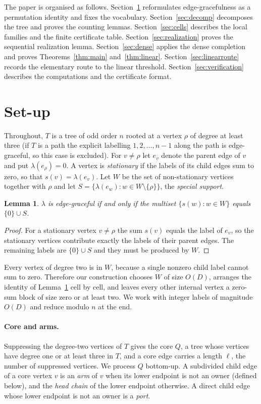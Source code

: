 \documentclass[11pt,a4paper]{article}
\theoremstyle{plain}
\newtheorem{lemma}[theorem]{Lemma}
\theoremstyle{definition}
\theoremstyle{remark}
\begin{document}
The paper is organised as follows.  Section~\ref{sec:setup} reformulates
edge-gracefulness as a permutation identity and fixes the vocabulary.
Section~\ref{sec:decomp} decomposes the tree and proves the counting lemmas.
Section~\ref{sec:cells} describes the local families and the finite
certificate table.  Section~\ref{sec:realization} proves the sequential
realization lemma.  Section~\ref{sec:dense} applies the dense completion and
proves Theorems~\ref{thm:main} and~\ref{thm:linear}.
Section~\ref{sec:linearroute} records the elementary route to the linear
threshold.  Section~\ref{sec:verification} describes the computations and the
certificate format.

\section{Set-up}\label{sec:setup}

Throughout, $T$ is a tree of odd order $n$ rooted at a vertex $\rho$ of degree
at least three (if $T$ is a path the explicit labelling $1,2,\dots,n-1$ along
the path is edge-graceful, so this case is excluded).  For $v\ne\rho$ let
$e_v$ denote the parent edge of $v$ and put $\lambda(e_\rho)=0$.  A vertex is
\emph{stationary} if the labels of its child edges sum to zero, so that
$s(v)=\lambda(e_v)$.  Let $W$ be the set of non-stationary vertices together
with $\rho$ and let $S=\{\lambda(e_w):w\in W\setminus\{\rho\}\}$, the
\emph{special support}.

\begin{lemma}\label{lem:sigma}
$\lambda$ is edge-graceful if and only if the multiset $\{s(w):w\in W\}$ equals
$\{0\}\cup S$.
\end{lemma}

\begin{proof}
For a stationary vertex $v\ne\rho$ the sum $s(v)$ equals the label of $e_v$,
so the stationary vertices contribute exactly the labels of their parent edges.
The remaining labels are $\{0\}\cup S$ and they must be produced by $W$.
\end{proof}

Every vertex of degree two is in $W$, because a single nonzero child label
cannot sum to zero.  Therefore our construction chooses $W$ of size $O(D)$,
arranges the identity of Lemma~\ref{lem:sigma} cell by cell, and leaves every
other internal vertex a zero-sum block of size zero or at least two.  We work
with integer labels of magnitude $O(D)$ and reduce modulo $n$ at the end.

\paragraph{Core and arms.}
Suppressing the degree-two vertices of $T$ gives the core $Q$, a tree whose
vertices have degree one or at least three in $T$, and a core edge carries a
length $\ell$, the number of suppressed vertices.  We process $Q$ bottom-up.
A subdivided child edge of a core vertex $v$ is an \emph{arm} of $v$ when its
lower endpoint is not an owner (defined below), and the \emph{head chain} of
the lower endpoint otherwise.  A direct child edge whose lower endpoint is not
an owner is a \emph{port}.
\end{document}
